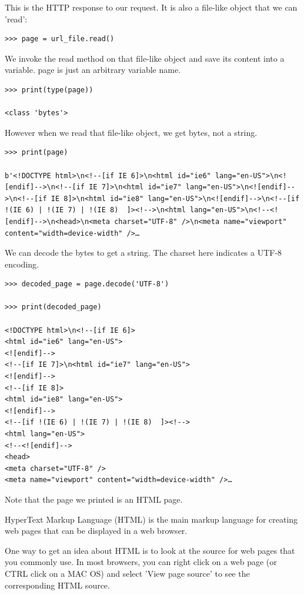 \documentclass{article}
\begin{document}
This is the HTTP response to our request.  It is also a file-like object that we can 'read':

\begin{lstlisting}
>>> page = url_file.read()
\end{lstlisting}

We invoke the read method on that file-like object and save its content into a variable.  page is just an arbitrary variable name.   

\begin{lstlisting}
>>> print(type(page))

<class 'bytes'>
\end{lstlisting}

However when we read that file-like object, we get bytes, not a string.

\begin{lstlisting}
>>> print(page)

b'<!DOCTYPE html>\n<!--[if IE 6]>\n<html id="ie6" lang="en-US">\n<![endif]-->\n<!--[if IE 7]>\n<html id="ie7" lang="en-US">\n<![endif]-->\n<!--[if IE 8]>\n<html id="ie8" lang="en-US">\n<![endif]-->\n<!--[if !(IE 6) | !(IE 7) | !(IE 8)  ]><!-->\n<html lang="en-US">\n<!--<![endif]-->\n<head>\n<meta charset="UTF-8" />\n<meta name="viewport" content="width=device-width" />…
\end{lstlisting}

We can decode the bytes to get a string.  The charset here indicates a UTF-8 encoding.

\begin{lstlisting}
>>> decoded_page = page.decode('UTF-8')

>>> print(decoded_page)

<!DOCTYPE html>\n<!--[if IE 6]>
<html id="ie6" lang="en-US">
<![endif]-->
<!--[if IE 7]>\n<html id="ie7" lang="en-US">
<![endif]-->
<!--[if IE 8]>
<html id="ie8" lang="en-US">
<![endif]-->
<!--[if !(IE 6) | !(IE 7) | !(IE 8)  ]><!-->
<html lang="en-US">
<!--<![endif]-->
<head>
<meta charset="UTF-8" />
<meta name="viewport" content="width=device-width" />…
\end{lstlisting}

Note that the page we printed is an HTML page.

HyperText Markup Language (HTML) is the main markup language for creating web pages that can be displayed in a web browser.

One way to get an idea about HTML is to look at the source for web pages that you commonly use.  In most browsers, you can right click on a web page (or CTRL click on a MAC OS) and select 'View page source' to see the corresponding HTML source.
\end{document}
